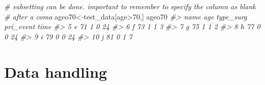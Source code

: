 \documentclass[
]{book}
\newenvironment{Shaded}{\begin{snugshade}}{\end{snugshade}}
\newcommand{\CommentTok}[1]{\textcolor[rgb]{0.56,0.35,0.01}{\textit{#1}}}
\newcommand{\DecValTok}[1]{\textcolor[rgb]{0.00,0.00,0.81}{#1}}
\newcommand{\NormalTok}[1]{#1}
\newcommand{\OtherTok}[1]{\textcolor[rgb]{0.56,0.35,0.01}{#1}}
\newcommand{\SpecialCharTok}[1]{\textcolor[rgb]{0.00,0.00,0.00}{#1}}
\begin{document}
\begin{Shaded}
\begin{Highlighting}[]
\CommentTok{\# subsetting can be done. important to remember to specify the column as blank }
\CommentTok{\# after a coma}
\NormalTok{ageo70}\OtherTok{\textless{}{-}}\NormalTok{test\_data[age}\SpecialCharTok{\textgreater{}}\DecValTok{70}\NormalTok{,]}
\NormalTok{ageo70}
\CommentTok{\#\textgreater{}    name age type\_surg pri\_event time}
\CommentTok{\#\textgreater{} 5     e  71         1         0   24}
\CommentTok{\#\textgreater{} 6     f  73         1         1    3}
\CommentTok{\#\textgreater{} 7     g  75         1         1    2}
\CommentTok{\#\textgreater{} 8     h  77         0         0   24}
\CommentTok{\#\textgreater{} 9     i  79         0         0   24}
\CommentTok{\#\textgreater{} 10    j  81         0         1    7}
\end{Highlighting}
\end{Shaded}

\hypertarget{data-handling}{%
\chapter{Data handling}\label{data-handling}}
\end{document}
